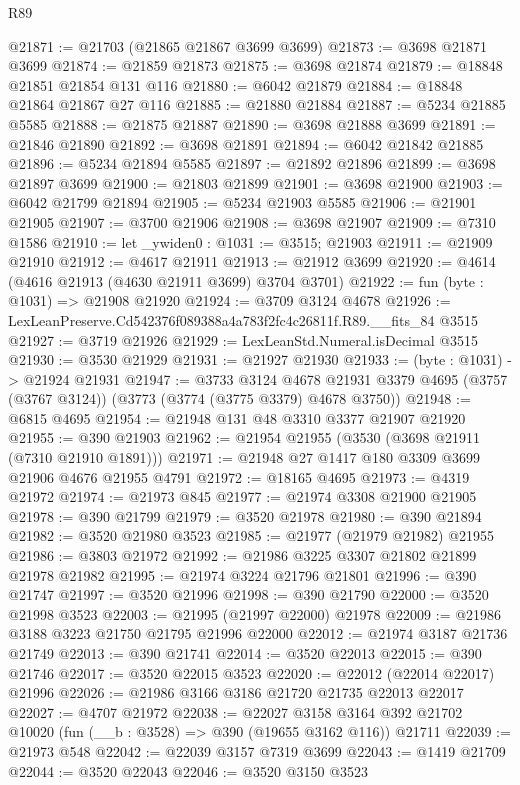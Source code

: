 \begin{lexlean}{R89}
\begin{coremodule}
@21871 := @21703 (@21865 @21867 @3699 @3699)
@21873 := @3698 @21871 @3699
@21874 := @21859 @21873
@21875 := @3698 @21874
@21879 := @18848 @21851 @21854 @131 @116
@21880 := @6042 @21879
@21884 := @18848 @21864 @21867 @27 @116
@21885 := @21880 @21884
@21887 := @5234 @21885 @5585
@21888 := @21875 @21887
@21890 := @3698 @21888 @3699
@21891 := @21846 @21890
@21892 := @3698 @21891
@21894 := @6042 @21842 @21885
@21896 := @5234 @21894 @5585
@21897 := @21892 @21896
@21899 := @3698 @21897 @3699
@21900 := @21803 @21899
@21901 := @3698 @21900
@21903 := @6042 @21799 @21894
@21905 := @5234 @21903 @5585
@21906 := @21901 @21905
@21907 := @3700 @21906
@21908 := @3698 @21907
@21909 := @7310 @1586
@21910 := let _ywiden0 : @1031 := @3515; @21903
@21911 := @21909 @21910
@21912 := @4617 @21911
@21913 := @21912 @3699
@21920 := @4614 (@4616 @21913 (@4630 @21911 @3699) @3704 @3701)
@21922 := fun (byte : @1031) => @21908 @21920
@21924 := @3709 @3124 @4678
@21926 := LexLeanPreserve.Cd542376f089388a4a783f2fc4c26811f.R89.__fits_84 @3515
@21927 := @3719 @21926
@21929 := LexLeanStd.Numeral.isDecimal @3515
@21930 := @3530 @21929
@21931 := @21927 @21930
@21933 := (byte : @1031) -> @21924 @21931
@21947 := @3733
    @3124
    @4678
    @21931
    @3379
    @4695
    (@3757 (@3767 @3124))
    (@3773 (@3774 (@3775 @3379) @4678 @3750))
@21948 := @6815 @4695
@21954 := @21948 @131 @48 @3310 @3377 @21907 @21920
@21955 := @390 @21903
@21962 := @21954 @21955 (@3530 (@3698 @21911 (@7310 @21910 @1891)))
@21971 := @21948 @27 @1417 @180 @3309 @3699 @21906 @4676 @21955 @4791
@21972 := @18165 @4695
@21973 := @4319 @21972
@21974 := @21973 @845
@21977 := @21974 @3308 @21900 @21905
@21978 := @390 @21799
@21979 := @3520 @21978
@21980 := @390 @21894
@21982 := @3520 @21980 @3523
@21985 := @21977 (@21979 @21982) @21955
@21986 := @3803 @21972
@21992 := @21986 @3225 @3307 @21802 @21899 @21978 @21982
@21995 := @21974 @3224 @21796 @21801
@21996 := @390 @21747
@21997 := @3520 @21996
@21998 := @390 @21790
@22000 := @3520 @21998 @3523
@22003 := @21995 (@21997 @22000) @21978
@22009 := @21986 @3188 @3223 @21750 @21795 @21996 @22000
@22012 := @21974 @3187 @21736 @21749
@22013 := @390 @21741
@22014 := @3520 @22013
@22015 := @390 @21746
@22017 := @3520 @22015 @3523
@22020 := @22012 (@22014 @22017) @21996
@22026 := @21986 @3166 @3186 @21720 @21735 @22013 @22017
@22027 := @4707 @21972
@22038 := @22027
    @3158
    @3164
    @392
    @21702
    @10020
    (fun (__b : @3528) => @390 (@19655 @3162 @116))
    @21711
@22039 := @21973 @548
@22042 := @22039 @3157 @7319 @3699
@22043 := @1419 @21709
@22044 := @3520 @22043
@22046 := @3520 @3150 @3523

\end{coremodule}
\end{lexlean}
